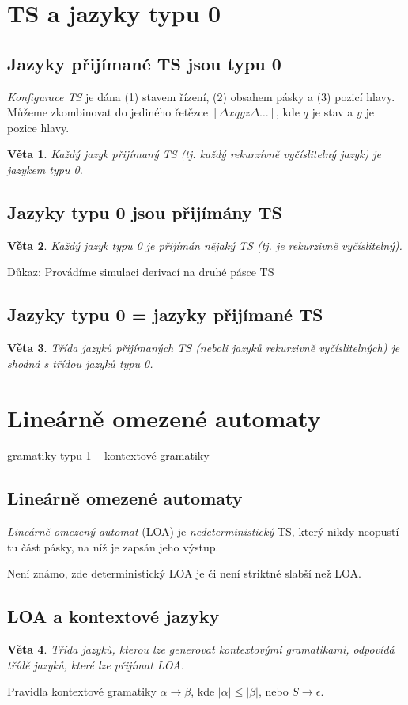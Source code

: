 \documentclass[a4paper, 11pt]{report}
\newtheorem{veta}{Věta}[chapter]
\begin{document}
\section{TS a jazyky typu 0}
\subsection{Jazyky přijímané TS jsou typu 0}
\emph{Konfigurace TS} je dána (1) stavem řízení, (2) obsahem pásky a (3) pozicí hlavy. Můžeme zkombinovat do jediného řetězce $[\Delta x q y z \Delta \dots ]$, kde $q$ je stav a $y$ je pozice hlavy.

\begin{veta}
Každý jazyk přijímaný TS (tj. každý rekurzívně vyčíslitelný jazyk) je jazykem typu 0.
\end{veta}

\subsection{Jazyky typu 0 jsou přijímány TS}
\begin{veta}
Každý jazyk typu 0 je přijímán nějaký TS (tj. je rekurzivně vyčíslitelný).
\end{veta}
Důkaz: Provádíme simulaci derivací na druhé pásce TS

\subsection{Jazyky typu 0 = jazyky přijímané TS}
\begin{veta}
Třída jazyků přijímaných TS (neboli jazyků rekurzivně vyčíslitelných) je shodná s třídou jazyků typu 0.
\end{veta}

\section{Lineárně omezené automaty}
gramatiky typu 1 -- kontextové gramatiky

\subsection{Lineárně omezené automaty}
\emph{Lineárně omezený automat} (LOA) je \emph{nedeterministický} TS, který nikdy neopustí tu část pásky, na níž je zapsán jeho výstup.

Není známo, zde deterministický LOA je či není striktně slabší než LOA.

\subsection{LOA a kontextové jazyky}
\begin{veta}
Třída jazyků, kterou lze generovat kontextovými gramatikami, odpovídá třídě jazyků, které lze přijímat LOA.
\end{veta}
Pravidla kontextové gramatiky $\alpha \to \beta$, kde $|\alpha| \leq |\beta|$, nebo $S \to \epsilon$.
\end{document}
